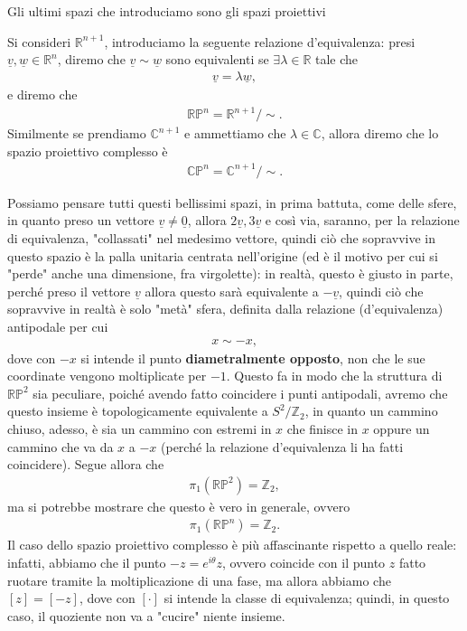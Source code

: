 Gli ultimi spazi che introduciamo sono gli spazi proiettivi
\begin{definition}
    Si consideri $\mathbb{R}^{n+1}$, introduciamo la seguente relazione d'equivalenza: presi $\underline{v}, \underline{w} \in \mathbb{R}^n$, diremo che $\underline{v} \sim \underline{w}$ sono equivalenti se $\exists \lambda \in \mathbb{R}$ tale che
    \begin{align}
        \underline{v} = \lambda \underline{w},
    \end{align}
    e diremo che
    \begin{align}
        \mathbb{RP}^n = \mathbb{R}^{n+1} \slash \sim.
    \end{align}
    Similmente se prendiamo $\mathbb{C}^{n+1}$ e ammettiamo che $\lambda \in \mathbb{C}$, allora diremo che lo spazio proiettivo complesso è
    \begin{align}
        \mathbb{CP}^n = \mathbb{C}^{n+1} \slash \sim.
    \end{align}
\end{definition}

Possiamo pensare tutti questi bellissimi spazi, in prima battuta, come delle sfere, in quanto preso un vettore $\underline{v} \neq \underline{0}$, allora $2\underline{v}, 3\underline{v}$ e così via, saranno, per la relazione di equivalenza, "collassati" nel medesimo vettore, quindi ciò che sopravvive in questo spazio è la palla unitaria centrata nell'origine (ed è il motivo per cui si "perde" anche una dimensione, fra virgolette): in realtà,
questo è giusto in parte, perché preso il vettore $\underline{v}$ allora questo sarà equivalente a $-\underline{v}$, quindi ciò che sopravvive in realtà è solo "metà" sfera, definita dalla relazione (d'equivalenza) antipodale per cui
\begin{align}
    x \sim -x,
\end{align} 
dove con $-x$ si intende il punto \textbf{diametralmente opposto}, non che le sue coordinate vengono moltiplicate per $-1$. Questo fa in modo che la struttura di $\mathbb{RP}^2$ sia peculiare, poiché avendo fatto coincidere i punti antipodali, avremo che questo insieme è topologicamente equivalente a $S^2 \slash \mathbb{Z}_2$, in quanto un cammino chiuso, adesso, è sia un cammino con estremi in $x$ che finisce in $x$ oppure un cammino che va da $x$ a $-x$ (perché la relazione d'equivalenza li ha fatti coincidere). Segue allora che
\begin{align}
    \pi_1(\mathbb{RP}^2) = \mathbb{Z}_2,
\end{align}
ma si potrebbe mostrare che questo è vero in generale, ovvero
\begin{align}
    \pi_1(\mathbb{RP}^n) = \mathbb{Z}_2.
\end{align}
Il caso dello spazio proiettivo complesso è più affascinante rispetto a quello reale: infatti, abbiamo che il punto $-z = e^{i\theta} z$, ovvero coincide con il punto $z$ fatto ruotare tramite la moltiplicazione di una fase, ma allora abbiamo che $[z] = [-z]$, dove con $[\cdot]$ si intende la classe di equivalenza; quindi, in questo caso, il quoziente non va a "cucire" niente insieme.